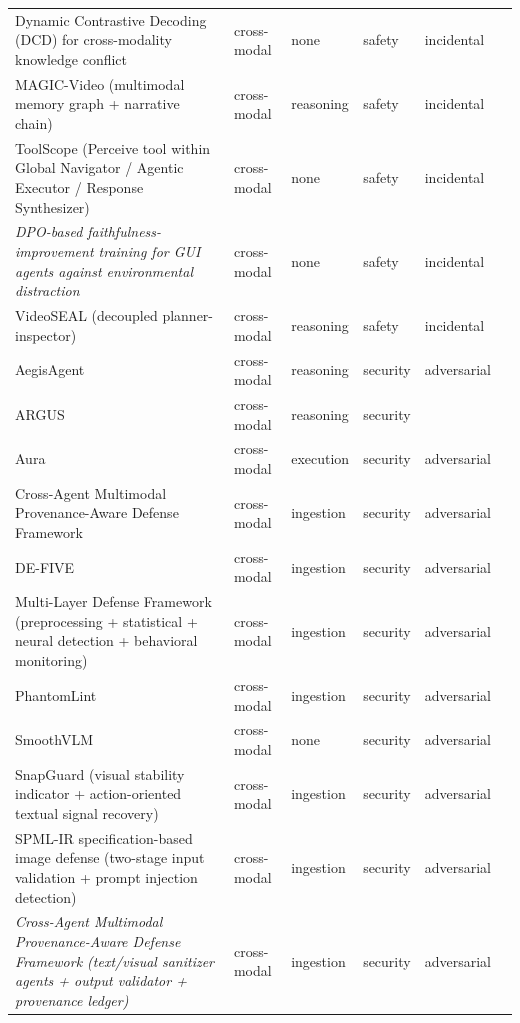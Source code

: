 \begin{longtable}{@{}>{\raggedright\arraybackslash}p{}lllll@{}}
Dynamic Contrastive Decoding (DCD) for cross-modality knowledge conflict & cross-modal & none & safety & incidental & \cite{zhu-2024-unraveling} \\
MAGIC-Video (multimodal memory graph + narrative chain) & cross-modal & reasoning & safety & incidental & \cite{li-2026-bridging} \\
ToolScope (Perceive tool within Global Navigator / Agentic Executor / Response Synthesizer) & cross-modal & none & safety & incidental & \cite{deng-2025-toolscope} \\
\emph{DPO-based faithfulness-improvement training for GUI agents against environmental distraction} & cross-modal & none & safety & incidental & \cite{ma-2024-caution} \\
VideoSEAL (decoupled planner-inspector) & cross-modal & reasoning & safety & incidental & \cite{qiu-2026-videoseal} \\
AegisAgent & cross-modal & reasoning & security & adversarial & \cite{wang-2025-aegisagent} \\
ARGUS & cross-modal & reasoning & security &  & \cite{lu-2025-argus} \\
Aura & cross-modal & execution & security & adversarial & \cite{zou-2026-blind} \\
Cross-Agent Multimodal Provenance-Aware Defense Framework & cross-modal & ingestion & security & adversarial & \cite{syed-2025-trustworthy} \\
DE-FIVE & cross-modal & ingestion & security & adversarial & \cite{zhong-2026-defive} \\
Multi-Layer Defense Framework (preprocessing + statistical + neural detection + behavioral monitoring) & cross-modal & ingestion & security & adversarial & \cite{pathade-2025-invisible} \\
PhantomLint & cross-modal & ingestion & security & adversarial & \cite{murray-2025-phantomlint} \\
SmoothVLM & cross-modal & none & security & adversarial & \cite{sun-2024-safeguarding} \\
SnapGuard (visual stability indicator + action-oriented textual signal recovery) & cross-modal & ingestion & security & adversarial & \cite{du-2026-snapguard} \\
SPML-IR specification-based image defense (two-stage input validation + prompt injection detection) & cross-modal & ingestion & security & adversarial & \cite{sharma-2024-defending} \\
\emph{Cross-Agent Multimodal Provenance-Aware Defense Framework (text/visual sanitizer agents + output validator + provenance ledger)} & cross-modal & ingestion & security & adversarial & \cite{syed-2025-crossagent} \\

\end{longtable}
